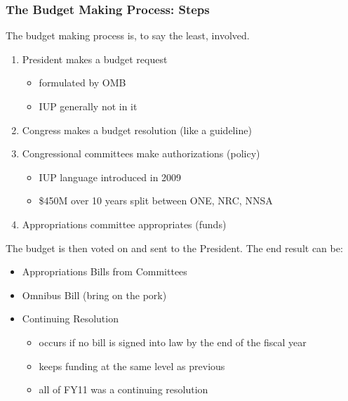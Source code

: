 \begin{frame}[ctb!]
  \frametitle{The Budget Making Process: Steps}
  The budget making process is, to say the least, involved.
  \begin{enumerate}
    \item President makes a budget request
      \begin{itemize}
        \item formulated by OMB
        \item IUP generally not in it
      \end{itemize}
    \pause
    \item Congress makes a budget resolution (like a guideline)
    \pause
    \item Congressional committees make authorizations (policy)
      \begin{itemize}
        \item IUP language introduced in 2009
        \item \$450M over 10 years split between ONE, NRC, NNSA
      \end{itemize}
    \pause
    \item Appropriations committee appropriates (funds)
  \end{enumerate}
  \pause
  The budget is then voted on and sent to the President. 
  The end result can be:
  \begin{itemize}
    \item Appropriations Bills from Committees
    \item Omnibus Bill (bring on the pork)
    \item Continuing Resolution
      \begin{itemize}
        \item occurs if no bill is signed into law by the end of 
          the fiscal year
        \item keeps funding at the same level as previous
        \item all of FY11 was a continuing resolution 
      \end{itemize}
  \end{itemize}
\end{frame}

